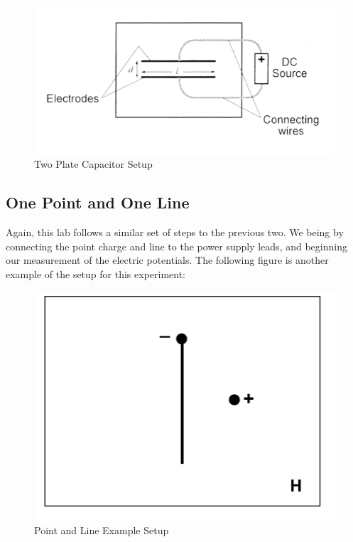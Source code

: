 \documentclass[titlepage]{article}
\begin{document}
    \FloatBarrier
    \begin{figure}[hbt!]
        \centering
        \caption{Two Plate Capacitor Setup}
        \includegraphics[scale=0.4]{procedure/capacitor}
    \end{figure} 
    \FloatBarrier


    \subsection{One Point and One Line}
    Again, this lab follows a similar set of steps to the previous two. We being by connecting the point charge and line to the power supply leads, and beginning our measurement of the electric potentials. The following figure is another example of the setup for this experiment:

    \FloatBarrier
    \begin{figure}[hbt!]
        \centering
        \caption{Point and Line Example Setup}
        \includegraphics[scale=0.4]{procedure/pointline}
    \end{figure} 
    \FloatBarrier
\end{document}

